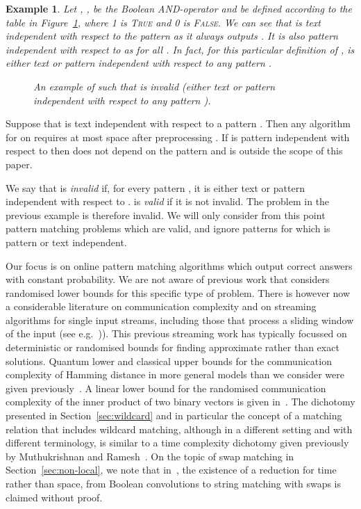 \documentclass{article}
\newcommand{\TRUE}{\textsc{True}\xspace}
\newcommand{\FALSE}{\textsc{False}\xspace}
\theoremstyle{plain}
\newtheorem{example}[theorem]{Example}
\theoremstyle{definition}
\begin{document}
\begin{example}
    Let , ,  be the Boolean AND-operator and  be defined according to the table in Figure~\ref{fig:example-invalid}, where 1 is \TRUE and 0 is \FALSE. We can see that  is text independent with respect to the pattern  as it always outputs . It is also pattern independent with respect to  as  for all . In fact, for this particular definition of ,  is either text or pattern independent with respect to any pattern .
\begin{figure}[t]
        
        \caption{\label{fig:example-invalid}An example of  such that  is invalid (either text or pattern independent with respect to any pattern ).}
    \end{figure}
\end{example}

Suppose that  is text independent with respect to a pattern . Then any algorithm for  on  requires at most  space after preprocessing . If  is pattern independent with respect to  then  does not depend on the pattern and is outside the scope of this paper.

We say that  is \emph{invalid} if, for every pattern , it is either text or pattern independent with respect to .  is \emph{valid} if it is not invalid. The problem  in the previous example is therefore invalid. We will only consider from this point pattern matching problems  which are valid, and ignore patterns for which  is pattern or text independent.

Our focus is on online pattern matching algorithms which output correct answers with constant probability.  We are not aware of previous work that considers randomised lower bounds for this specific type of problem. There is however now a considerable literature on communication complexity and on streaming algorithms for single input streams, including those that process a sliding window of the input (see e.g.~\cite{DGIM:02})). This previous streaming work has typically focussed on deterministic or randomised bounds for finding approximate rather than exact solutions.  Quantum lower and classical upper bounds for the communication complexity of Hamming distance in more general models than we consider were given previously~\cite{HSZZ:06}. A linear lower bound for the randomised communication complexity of the inner product of two binary vectors is given in~\cite{CG:1985}.   The dichotomy presented in Section~\ref{sec:wildcard} and in particular the concept of  a matching relation that includes wildcard matching, although in a different setting and with different terminology, is similar to a time complexity dichotomy given previously by Muthukrishnan and Ramesh~\cite{MR:95}. On the topic of swap matching in Section~\ref{sec:non-local}, we note that in~\cite{AALLL:00}, the existence of a reduction for time rather than space, from Boolean convolutions to string matching with swaps is claimed without proof.
\end{document}
